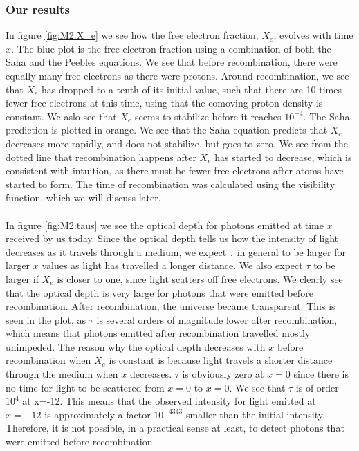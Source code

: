 \documentclass{aa}
\begin{document}
\subsubsection{Our results}
In figure \ref{fig:M2:X_e} we see how the free electron fraction, $X_e$, evolves with time $x$. The blue plot is the free electron fraction using a combination of both
the Saha and the Peebles equations. We see that before recombination, there were equally many free electrons as there were protons. Around recombination, we see 
that $X_e$ has dropped to a tenth of its initial value, such that there are 10 times fewer free electrons at this time, using that the comoving proton density is constant. We aslo see
that $X_e$ seems to stabilize before it reaches $10^{-4}$. The Saha prediction is plotted in orange. We see that the Saha equation predicts that $X_e$ decreases more rapidly, and does not 
stabilize, but goes to zero. We see from the dotted line that recombination happens after $X_e$ has started to decrease, which is consistent with intuition, as there must be fewer free electrons after atoms have started to form.
The time of recombination was calculated using the visibility function, which
we will discuss later.\\
\\
In figure \ref{fig:M2:taus} we see the optical depth for photons emitted at time $x$ received by us today. Since the optical depth tells us how the intensity of light decreases as it travels through a medium,
we expect $\tau$ in general to be larger for larger $x$ values as light has travelled a longer distance. We also expect $\tau$ to be larger if $X_e$ is closer to one, since light scatters off free electrons. We clearly see that the optical depth is very large for photons that were 
emitted before recombination. After recombination, the universe became transparent. This is seen in the plot, as $\tau$ is several orders of magnitude lower after recombination, which
means that photons emitted after recombination travelled mostly unimpeded. The reason why the optical depth decreases with $x$ before recombination when $X_e$ is constant is because light
travels a shorter distance through the medium when $x$ decreases. $\tau$ is obviously zero at $x=0$ since there is no time for light to be scattered from $x=0$ to $x=0$. We see that $\tau$ is of order $10^4$ at x=-12.
This means that the observed intensity for light emitted at $x=-12$ is approximately a factor $10^{-4343}$ smaller than the initial intensity. Therefore, it is not possible,
in a practical sense at least, to detect photons that were emitted before recombination.\\ 
\\
  
\end{document}
